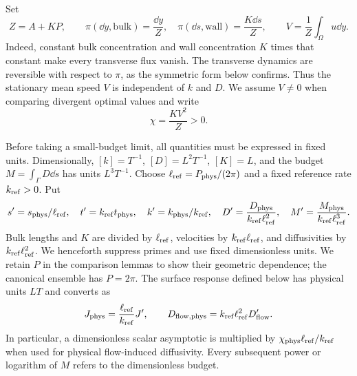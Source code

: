 Set
\begin{equation}\label{eq:equilibrium}
 Z=A+KP,\qquad
 \pi(\dd y,\mathrm{bulk})=\frac{\dd y}{Z},\quad
 \pi(\dd s,\mathrm{wall})=\frac{K\dd s}{Z},\qquad
 V=\frac{1}{Z}\int_\Omega u\dd y.
\end{equation}
Indeed, constant bulk concentration and wall concentration $K$ times that
constant make every transverse flux vanish. The transverse dynamics are
reversible with respect to $\pi$, as the symmetric form below confirms.
Thus the stationary mean speed $V$ is independent of $k$ and $D$.
We assume $V\ne0$ when comparing divergent optimal values and write
\begin{equation}\label{eq:chi}
 \chi=\frac{KV^2}{Z}>0.
\end{equation}

Before taking a small-budget limit, all quantities must be expressed in
fixed units. Dimensionally, $[k]=T^{-1}$, $[D]=L^2T^{-1}$,
$[K]=L$, and the budget $M=\int_\Gamma D\dd s$ has units $L^3T^{-1}$.
Choose $\ell_{\rm ref}=P_{\rm phys}/(2\pi)$ and a fixed reference rate
$k_{\rm ref}>0$. Put
\begin{equation}\label{eq:units}
 s'=s_{\rm phys}/\ell_{\rm ref},\quad t'=k_{\rm ref}t_{\rm phys},\quad
 k'=k_{\rm phys}/k_{\rm ref},\quad
 D'=\frac{D_{\rm phys}}{k_{\rm ref}\ell_{\rm ref}^2},\quad
 M'=\frac{M_{\rm phys}}{k_{\rm ref}\ell_{\rm ref}^3}.
\end{equation}
Bulk lengths and $K$ are divided by $\ell_{\rm ref}$, velocities by
$k_{\rm ref}\ell_{\rm ref}$, and diffusivities by
$k_{\rm ref}\ell_{\rm ref}^2$. We henceforth suppress primes and use fixed
dimensionless units. We retain $P$ in the comparison lemmas to show their
geometric dependence; the canonical ensemble has $P=2\pi$. The surface
response defined below has physical units $LT$ and converts as
\begin{equation}\label{eq:J-dimensional}
 J_{\rm phys}=\frac{\ell_{\rm ref}}{k_{\rm ref}}J',\qquad
 D_{\mathrm{flow},\rm phys}=k_{\rm ref}\ell_{\rm ref}^2D'_{\mathrm{flow}}.
\end{equation}
In particular, a dimensionless scalar asymptotic is multiplied by
$\chi_{\rm phys}\ell_{\rm ref}/k_{\rm ref}$ when used for physical
flow-induced diffusivity. Every subsequent power or logarithm of $M$
refers to the dimensionless budget.

